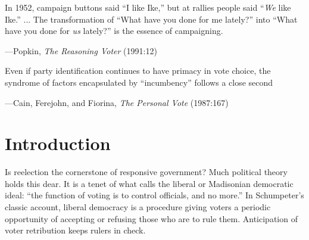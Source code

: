 \documentclass[letter,12pt]{article}
\begin{document}
\epigraph{
  In 1952, campaign buttons said ``I like Ike,'' but at rallies people said ``\emph{We} like Ike.'' ... The transformation of ``What have you done for me lately?'' into ``What have you done for \emph{us} lately?'' is the essence of campaigning.}{---Popkin, \emph{The Reasoning Voter} (1991:12)}

\epigraph{Even if party identification continues to have primacy in vote choice, the syndrome of factors encapsulated by ``incumbency'' follows a close second}{---Cain, Ferejohn, and Fiorina, \emph{The Personal Vote} (1987:167)}

\onehalfspacing

\section{Introduction}

Is reelection the cornerstone of responsive government? Much political theory holds this dear. It is a tenet of what \citet[][:9]{riker.lib.pop.1978} calls the liberal or Madisonian democratic ideal: ``the function of voting is to control officials, and no more.'' In Schumpeter's \citeyearpar{schumpeter.1942} classic account, liberal democracy is a procedure giving voters a periodic opportunity of accepting or refusing those who are to rule them. Anticipation of voter retribution keeps rulers in check. 

\end{document}
